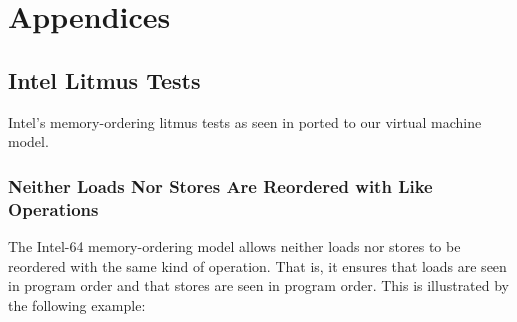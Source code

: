 \appendix


\section*{Appendices}


\renewcommand{\thesubsection}{\Alph{subsection}}

\renewcommand{\tablename}{Example}

\subsection{Intel Litmus Tests}

\label{appendix:litmus:intel}

Intel's memory-ordering litmus tests as seen in \cite[Section 8.2.3]{ref:Intel} ported to our virtual machine model.





\subsubsection*{Neither Loads Nor Stores Are Reordered with Like Operations}

The Intel-64 memory-ordering model allows neither loads nor stores to be reordered with the same kind of operation.
That is, it ensures that loads are seen in program order and that stores are seen in program order.
This is illustrated by the following example:

